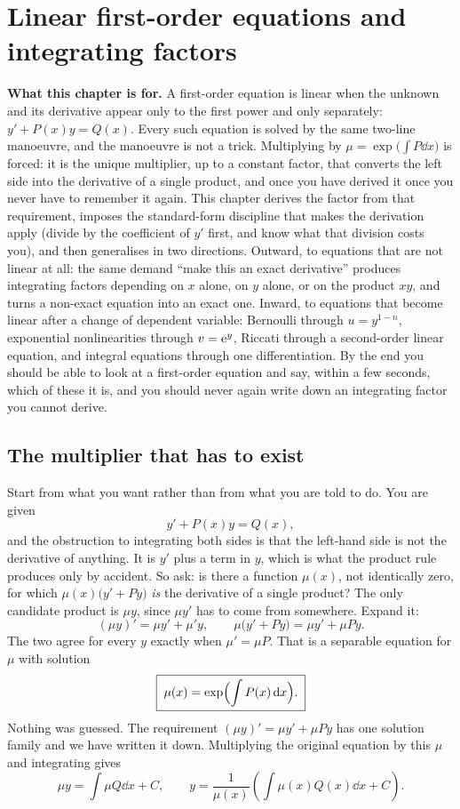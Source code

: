 \chapter{Linear first-order equations and integrating factors}

\begin{orient}
\textbf{What this chapter is for.} A first-order equation is linear when the unknown and its derivative appear only to the first power and only separately: $y'+P(x)y=Q(x)$. Every such equation is solved by the same two-line manoeuvre, and the manoeuvre is not a trick. Multiplying by $\mu=\exp\bigl(\int P\dd x\bigr)$ is forced: it is the unique multiplier, up to a constant factor, that converts the left side into the derivative of a single product, and once you have derived it once you never have to remember it again. This chapter derives the factor from that requirement, imposes the standard-form discipline that makes the derivation apply (divide by the coefficient of $y'$ first, and know what that division costs you), and then generalises in two directions. Outward, to equations that are not linear at all: the same demand ``make this an exact derivative'' produces integrating factors depending on $x$ alone, on $y$ alone, or on the product $xy$, and turns a non-exact equation into an exact one. Inward, to equations that become linear after a change of dependent variable: Bernoulli through $u=y^{1-n}$, exponential nonlinearities through $v=\mathrm{e}^{y}$, Riccati through a second-order linear equation, and integral equations through one differentiation. By the end you should be able to look at a first-order equation and say, within a few seconds, which of these it is, and you should never again write down an integrating factor you cannot derive.
\end{orient}

\section{The multiplier that has to exist}

Start from what you want rather than from what you are told to do. You are given
\[y'+P(x)y=Q(x),\]
and the obstruction to integrating both sides is that the left-hand side is not the derivative of anything. It is $y'$ plus a term in $y$, which is what the product rule produces only by accident. So ask: is there a function $\mu(x)$, not identically zero, for which $\mu(x)\bigl(y'+Py\bigr)$ \emph{is} the derivative of a single product? The only candidate product is $\mu y$, since $\mu y'$ has to come from somewhere. Expand it:
\[(\mu y)'=\mu y'+\mu' y,\qquad \mu\bigl(y'+Py\bigr)=\mu y'+\mu P y.\]
The two agree for every $y$ exactly when $\mu'=\mu P$. That is a separable equation for $\mu$ with solution
\[\boxed{\;\mu(x)=\exp\Bigl(\int P(x)\,\mathrm{d} x\Bigr).\;}\]
Nothing was guessed. The requirement $(\mu y)'=\mu y'+\mu Py$ has one solution family and we have written it down. Multiplying the original equation by this $\mu$ and integrating gives
\[\mu y=\int \mu Q\dd x+C,\qquad y=\frac{1}{\mu(x)}\left(\int\mu(x)Q(x)\dd x+C\right).\]

